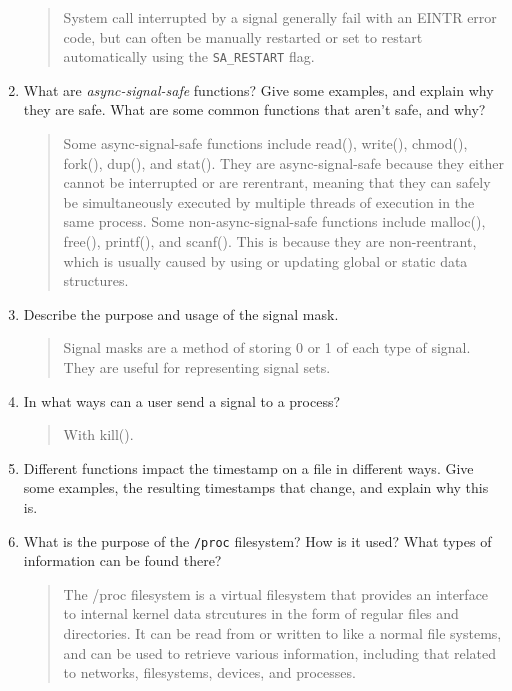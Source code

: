 \documentclass[letterpaper,10pt,onecolumn,titlepage]{article}
\begin{document}
\begin{enumerate}
\begin{quote}
    System call interrupted by a signal generally fail with an EINTR error code, but can often be manually restarted or set to restart automatically using the \texttt{SA\_RESTART} flag.
\end{quote}

\item What are \emph{async-signal-safe} functions? Give some examples, and explain why
  they are safe. What are some common functions that aren't safe, and why?

\begin{quote}
    Some async-signal-safe functions include read(), write(), chmod(), fork(), dup(), and stat().  They are async-signal-safe because they either cannot be interrupted or are rerentrant, meaning that they can safely be simultaneously executed by multiple threads of execution in the same process.  Some non-async-signal-safe functions include malloc(), free(), printf(), and scanf().  This is because they are non-reentrant, which is usually caused by using or updating global or static data structures.
\end{quote}

\item Describe the purpose and usage of the signal mask.

\begin{quote}
    Signal masks are a method of storing 0 or 1 of each type of signal.  They are useful for representing signal sets.
\end{quote}

\item In what ways can a user send a signal to a process?

\begin{quote}
    With kill().
\end{quote}

\item Different functions impact the timestamp on a file in different ways. Give some
  examples, the resulting timestamps that change, and explain why this is.

\begin{quote}

\end{quote}

\item What is the purpose of the \texttt{/proc} filesystem? How is it used? What types of
  information can be found there?

\begin{quote}
    The /proc filesystem is a virtual filesystem that provides an interface to internal kernel data strcutures in the form of regular files and directories.  It can be read from or written to like a normal file systems, and can be used to retrieve various information, including that related to networks, filesystems, devices, and processes.
\end{quote}


\end{enumerate}
\end{document}
